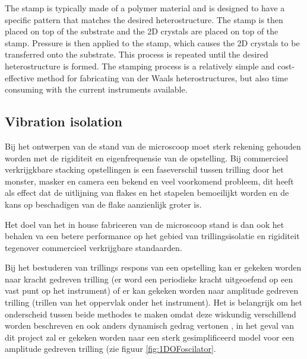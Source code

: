 \documentclass[11pt]{article}
\begin{document}
 The stamp is typically made of a polymer material and is designed to have a specific pattern that matches the desired heterostructure. 
 The stamp is then placed on top of the substrate and the 2D crystals are placed on top of the stamp. 
 Pressure is then applied to the stamp, which causes the 2D crystals to be transferred onto the substrate. This process is repeated until the desired heterostructure is formed. 
 The stamping process is a relatively simple and cost-effective method for fabricating van der Waals heterostructures, but also time consuming with the current instruments available.

\subsection{Vibration isolation}
Bij het ontwerpen van de stand van de microscoop moet sterk rekening gehouden worden met de rigiditeit en eigenfrequensie van de opstelling. 
Bij commercieel verkrijgkbare stacking opstellingen is een faseverschil tussen trilling door het monster, masker en camera een bekend en veel voorkomend probleem, dit heeft als effect dat de uitlijning van flakes en het stapelen bemoeilijkt worden en de kans op beschadigen van de flake aanzienlijk groter is.


Het doel van het in house fabriceren van de microscoop stand is dan ook het behalen va een betere performance op het gebied van trillingsisolatie en rigiditeit tegenover commercieel verkrijgbare standaarden.

Bij het bestuderen van trillings respons van een opstelling kan er gekeken worden naar kracht gedreven trilling (er word een periodieke kracht uitgeoefend op een vast punt op het instrument) of er kan gekeken worden naar amplitude gedreven trilling (trillen van het oppervlak onder het instrument).
Het is belangrijk om het onderscheid tussen beide methodes te maken omdat deze wiskundig verschillend worden beschreven en ook anders dynamisch gedrag vertonen \citep{hesselberthBasicCalculationsVibration2015}, in het geval van dit project zal er gekeken worden naar een sterk gesimplificeerd model voor een amplitude gedreven trilling (zie figuur \ref{fig:1DOFoscilator}.
\end{document}

